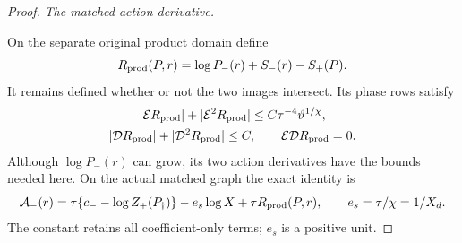 \begin{proof}
\smallskip
\noindent\emph{The matched action derivative.}

On the separate original product domain define
\begin{equation}
 R_{\rm prod}(P,r)=\log P_-(r)+S_-(r)-S_+(P).
 \label{deg:source-growing-product-remainder}
\end{equation}
It remains defined whether or not the two images intersect.
Its phase rows satisfy
\begin{equation}
 \begin{gathered}
 |\mathcal ER_{\rm prod}|+|\mathcal E^2R_{\rm prod}|
                  \le C\tau^{-4}\vartheta^{1/\chi},\\
 |\mathcal DR_{\rm prod}|+|\mathcal D^2R_{\rm prod}|\le C,
 \qquad \mathcal E\mathcal DR_{\rm prod}=0 .
 \end{gathered}
 \label{deg:source-growing-product-phase-rows}
\end{equation}
Although \(\log P_-(r)\) can grow, its two action derivatives have
the bounds needed here.
On the actual matched graph the exact identity is
\begin{equation}
 \mathcal A_-(r)=
 \tau\{c_--\log Z_+(P_\dagger)\}
             -e_s\log X+\tau R_{\rm prod}(P,r),
 \qquad e_s=\tau/\chi=1/X_d .
 \label{deg:degree-growing-matching}
\end{equation}
The constant retains all coefficient-only terms; $e_s$ is a positive unit.


\end{proof}
